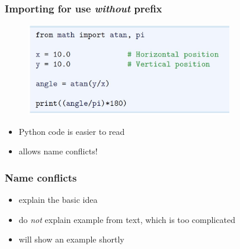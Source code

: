 \documentclass[14pt]{beamer}
\newcommand\red[1]{{\color{red} #1}}
\newcommand\green[1]{{\color{green} #1}}
\newcommand{\cmark}{\ding{51}}%
\newcommand{\xmark}{\ding{55}}%
\begin{document}

\begin{frame}[fragile]
\frametitle{Importing for use \emph{without} prefix}

\begin{figure}[ht]
	\centering
	\includegraphics[width=0.8\textwidth]{figures/LLp13b}
\end{figure}
\begin{itemize}
	\item[\green{\cmark}] Python code is easier to read
	\item[\red{\xmark}] allows name conflicts!
\end{itemize}

\end{frame}


\begin{frame}[fragile]
\frametitle{Name conflicts}

\begin{itemize}
	\item explain the basic idea
	\item do \emph{not} explain example from text, which is too complicated
	\item will show an example shortly
\end{itemize}

\end{frame}

\end{document}
